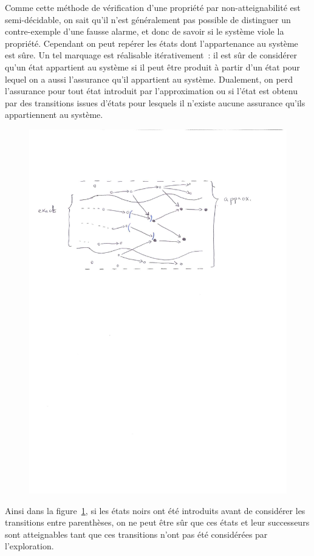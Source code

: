 Comme cette méthode de vérification d'une propriété par non-atteignabilité est semi-décidable,
on sait qu'il n'est généralement pas possible de distinguer un contre-exemple d'une fausse alarme,
et donc de savoir si le système viole la propriété.
Cependant on peut repérer les états dont l'appartenance au système est sûre. 
Un tel marquage est réalisable itérativement~: il est sûr de considérer qu'un état
appartient au système si il peut être produit à partir d'un état pour lequel on a aussi l'assurance qu'il
appartient au système. Dualement, on perd l'assurance pour tout état introduit par l'approximation ou
si l'état est obtenu par des transitions issues d'états pour lesquels il n'existe aucune assurance
qu'ils appartiennent au système.
\begin{figure}[ht!]
  \centering
  \includegraphics[width=12cm]{4_contre_ex/illustration}
  \caption{\footnotesize }
  \label{fig:illustration}
\end{figure}
Ainsi dans la figure~\ref{fig:illustration}, si les états noirs ont été introduits avant de considérer les transitions
entre parenthèses, on ne peut être sûr que ces états et leur successeurs sont atteignables tant que 
ces transitions n'ont pas été considérées par l'exploration.

